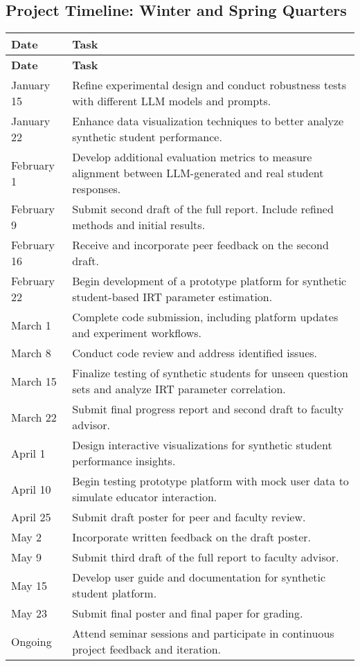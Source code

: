 \documentclass[12pt, letterpaper]{article}
\begin{document}
\subsection{Project Timeline: Winter and Spring Quarters}

\begin{longtable}{@{}p{}p{}@{}}
    \toprule
    \textbf{Date} & \textbf{Task} \\
    \midrule
    \endfirsthead
    \toprule
    \textbf{Date} & \textbf{Task} \\
    \midrule
    \endhead
    \bottomrule
    \endfoot
    January 15 & Refine experimental design and conduct robustness tests with different LLM models and prompts. \\
    January 22 & Enhance data visualization techniques to better analyze synthetic student performance. \\
    February 1 & Develop additional evaluation metrics to measure alignment between LLM-generated and real student responses. \\
    February 9 & Submit second draft of the full report. Include refined methods and initial results. \\
    February 16 & Receive and incorporate peer feedback on the second draft. \\
    February 22 & Begin development of a prototype platform for synthetic student-based IRT parameter estimation. \\
    March 1 & Complete code submission, including platform updates and experiment workflows. \\
    March 8 & Conduct code review and address identified issues. \\
    March 15 & Finalize testing of synthetic students for unseen question sets and analyze IRT parameter correlation. \\
    March 22 & Submit final progress report and second draft to faculty advisor. \\
    April 1 & Design interactive visualizations for synthetic student performance insights. \\
    April 10 & Begin testing prototype platform with mock user data to simulate educator interaction. \\
    April 25 & Submit draft poster for peer and faculty review. \\
    May 2 & Incorporate written feedback on the draft poster. \\
    May 9 & Submit third draft of the full report to faculty advisor. \\
    May 15 & Develop user guide and documentation for synthetic student platform. \\
    May 23 & Submit final poster and final paper for grading. \\
    Ongoing & Attend seminar sessions and participate in continuous project feedback and iteration. \\
\end{longtable}
\end{document}
